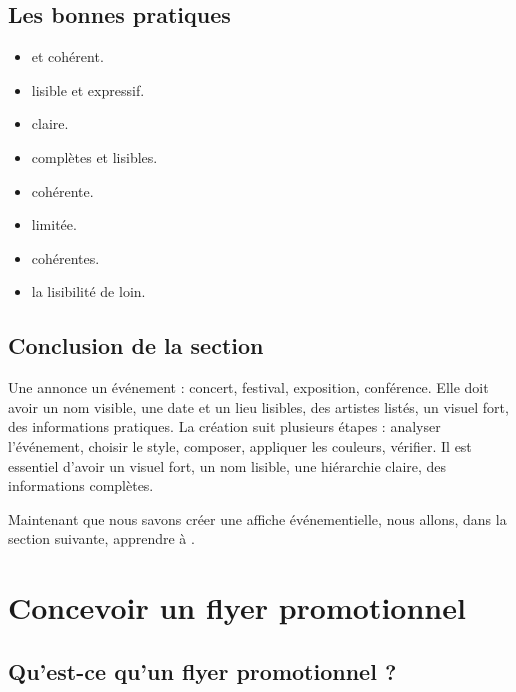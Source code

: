 \subsection{Les bonnes pratiques}

\begin{itemize}
    \item {} et cohérent.
    \item {} lisible et expressif.
    \item {} claire.
    \item {} complètes et lisibles.
    \item {} cohérente.
    \item {} limitée.
    \item {} cohérentes.
    \item {} la lisibilité de loin.
\end{itemize}

\subsection*{Conclusion de la section}

Une  annonce un événement : concert, festival, exposition, conférence. Elle doit avoir un nom visible, une date et un lieu lisibles, des artistes listés, un visuel fort, des informations pratiques. La création suit plusieurs étapes : analyser l'événement, choisir le style, composer, appliquer les couleurs, vérifier. Il est essentiel d'avoir un visuel fort, un nom lisible, une hiérarchie claire, des informations complètes.

Maintenant que nous savons créer une affiche événementielle, nous allons, dans la section suivante, apprendre à .

\section{Concevoir un flyer promotionnel}

\subsection{Qu'est-ce qu'un flyer promotionnel ?}

